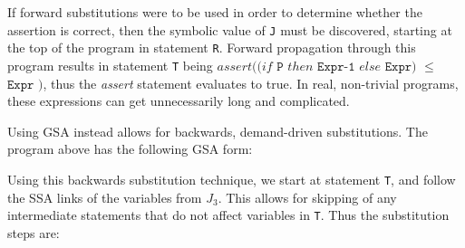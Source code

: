 \begin{figure*}[ht]
\centering
{}
\caption{A program on which to perform symbolic analysis.}
\label{fig:tupaduaexample}
\end{figure*}

If forward substitutions were to be used in order to determine whether the assertion is correct, then the symbolic value of \texttt{J} must be discovered, starting at the top of the program in statement \texttt{R}. 
Forward propagation through this program results in statement \texttt{T} being $assert((if $ $\texttt{P}$ $then$ $\texttt{Expr-1}$ $else$ $\texttt{Expr)}$ $\leq$ $\texttt{Expr}$ $\texttt{)}$, thus the \textit{assert} statement evaluates to true. 
In real, non-trivial programs, these expressions can get unnecessarily long and complicated.

Using GSA instead allows for backwards, demand-driven substitutions. The program above has the following GSA form:


Using this backwards substitution technique, we start at statement \texttt{T}, and follow the SSA links of the variables from ${J_3}$. 
This allows for skipping of any intermediate statements that do not affect variables in \texttt{T}. 
Thus the substitution steps are:

